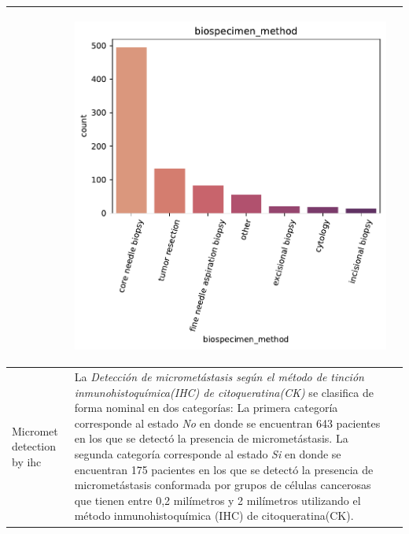 \begin{table}[!htb]
\begin{threeparttable}
\begin{tabular}{p{2.5cm} p{7.5cm} p{6.5cm}}
			& \begin{center}\includegraphics[width=1\linewidth]{NOTEBOOK/IMAGENES_DESCRIPTIVAS/27_biospecimen_method}\end{center}
			\\ \hline
			Micromet detection by ihc 
			& La \textit{Detección de micrometástasis según el método de tinción inmunohistoquímica(IHC) de citoqueratina(CK)} se clasifica de forma nominal en dos categorías: La primera categoría corresponde al estado \textit{No} en donde se encuentran 643 pacientes en los que se detectó la presencia de micrometástasis. La segunda categoría corresponde al estado \textit{Si} en donde se encuentran 175  pacientes en los que se detectó la presencia de micrometástasis conformada por grupos de células cancerosas que tienen entre 0,2 milímetros y 2 milímetros  utilizando el método inmunohistoquímica (IHC) de citoqueratina(CK).

\end{tabular}
\end{threeparttable}
\end{table}
